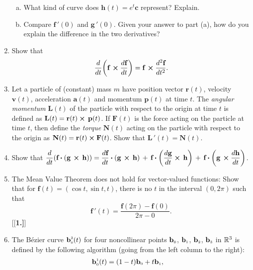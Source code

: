 \begin{enumerate}[\bfseries 1.]
\begin{enumerate}[(a)]
   \item What kind of curve does $\textbf{h}(t) = e^t\textbf{c}$ represent? Explain.
   \item Compare $\textbf{f}\,'(0)$ and $\textbf{g}\,'(0)$. 
   Given your answer to part (a), how do you explain the difference in the two derivatives?
  \end{enumerate}
 \item Show that 
 \[\dfrac{d}{dt} \biggl( \textbf{f}\, \bm{\times} \dfrac{d\textbf{f}}{dt} \biggr) =
  \textbf{f}\, \bm{\times} \dfrac{d^2 \textbf{f}}{dt^2}.\]
 \item Let a particle of (constant) mass $m$ have position vector $\textbf{r}(t)$, velocity $\textbf{v}(t)$,
  acceleration $\textbf{a}(t)$ and momentum $\textbf{p}(t)$ at time $t$. The \emph{angular momentum} $\textbf{L}(t)$ of
  the particle with respect to the origin at time $t$ is defined as $\textbf{L}(t) =
  \textbf{r}(t) \bm{\times} \,\textbf{p}(t)$. If $\textbf{F}(t)$ is the force acting on the particle at time $t$, then
  define the \emph{torque} $\textbf{N}(t)$ acting on the particle with respect to the origin as
  $\textbf{N}(t) = \textbf{r}(t) \bm{\times} \textbf{F}(t)$. Show that $\textbf{L}\,'(t) = \textbf{N}(t)$.
 \item Show that $\dfrac{d}{dt} ( \textbf{f} \bm{\cdot} ( \textbf{g}\, \bm{\times} \,\textbf{h} ) ) =
  \dfrac{d\textbf{f}}{dt} \bm{\cdot} (\textbf{g}\, \bm{\times} \,\textbf{h}) \,+\,
  \textbf{f} \bm{\cdot} \biggl(\dfrac{d \textbf{g}}{dt} \bm{\times} \,\textbf{h}\biggr) \,+\,
  \textbf{f} \bm{\cdot} \biggl(\textbf{g}\, \bm{\times} \dfrac{d \textbf{h}}{dt}\biggr)$.
 \item The Mean Value Theorem does not hold for vector-valued functions:
 Show that for $\textbf{f}(t) = (\cos t, \sin t,t)$, there is no $t$ in the interval $(0,2\pi)$ such that
 \begin{displaymath}
  \textbf{f}\,'(t) = \dfrac{\textbf{f}(2\pi) - \textbf{f}(0)}{2\pi - 0} .
 \end{displaymath}
[{[\bfseries 1.]}]
 \item The B\'{e}zier curve $\textbf{b}_{\scriptscriptstyle 0}^{\scriptscriptstyle 3}(t)$ for four noncollinear points
  $\textbf{b}_{\scriptscriptstyle 0}$, $\textbf{b}_{\scriptscriptstyle 1}$, $\textbf{b}_{\scriptscriptstyle 2}$, $\textbf{b}_{\scriptscriptstyle 3}$ in $\mathbb{R}^{3}$ is
  defined by the following algorithm (going from the left column to the right):
  \begin{alignat*}{3}
   \ssub{\textbf{b}}{0}^{\scriptscriptstyle 1}(t) &= ( 1 - t )\ssub{\textbf{b}}{0} + t \ssub{\textbf{b}}{1},

\end{alignat*}
\end{enumerate}
